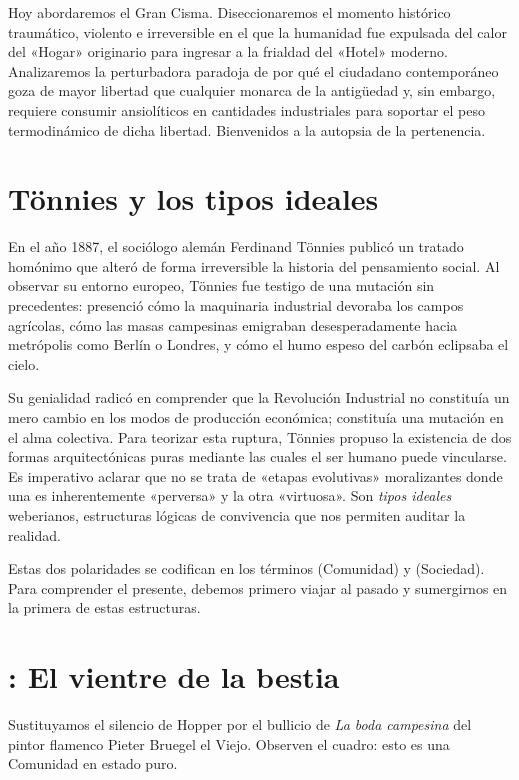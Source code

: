 Hoy abordaremos el Gran Cisma. Diseccionaremos el momento histórico traumático, violento e irreversible en el que la humanidad fue expulsada del calor del «Hogar» originario para ingresar a la frialdad del «Hotel» moderno. Analizaremos la perturbadora paradoja de por qué el ciudadano contemporáneo goza de mayor libertad que cualquier monarca de la antigüedad y, sin embargo, requiere consumir ansiolíticos en cantidades industriales para soportar el peso termodinámico de dicha libertad. Bienvenidos a la autopsia de la pertenencia.

\section{Tönnies y los tipos ideales}

En el año 1887, el sociólogo alemán Ferdinand Tönnies publicó un tratado homónimo que alteró de forma irreversible la historia del pensamiento social. Al observar su entorno europeo, Tönnies fue testigo de una mutación sin precedentes: presenció cómo la maquinaria industrial devoraba los campos agrícolas, cómo las masas campesinas emigraban desesperadamente hacia metrópolis como Berlín o Londres, y cómo el humo espeso del carbón eclipsaba el cielo. 

Su genialidad radicó en comprender que la Revolución Industrial no constituía un mero cambio en los modos de producción económica; constituía una mutación en el alma colectiva. Para teorizar esta ruptura, Tönnies propuso la existencia de dos formas arquitectónicas puras mediante las cuales el ser humano puede vincularse. Es imperativo aclarar que no se trata de «etapas evolutivas» moralizantes donde una es inherentemente «perversa» y la otra «virtuosa». Son \textit{tipos ideales} weberianos, estructuras lógicas de convivencia que nos permiten auditar la realidad. 

Estas dos polaridades se codifican en los términos \textbf{\Gemeinschaft} (Comunidad) y \textbf{\Gesellschaft} (Sociedad). Para comprender el presente, debemos primero viajar al pasado y sumergirnos en la primera de estas estructuras.

\section{\Gemeinschaft: El vientre de la bestia}

Sustituyamos el silencio de Hopper por el bullicio de \textit{La boda campesina} del pintor flamenco Pieter Bruegel el Viejo. Observen el cuadro: esto es una Comunidad en estado puro. 

